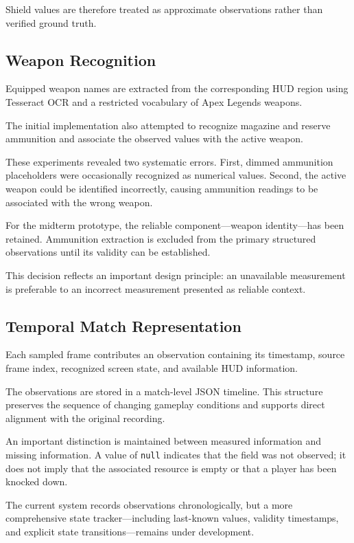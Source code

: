 \documentclass[10pt,letterpaper]{article}
\begin{document}
Shield values are therefore treated as approximate
observations rather than verified ground truth.

\subsection{Weapon Recognition}

Equipped weapon names are extracted from the corresponding
HUD region using Tesseract OCR and a restricted vocabulary
of Apex Legends weapons.

The initial implementation also attempted to recognize
magazine and reserve ammunition and associate the observed
values with the active weapon.

These experiments revealed two systematic errors. First,
dimmed ammunition placeholders were occasionally recognized
as numerical values. Second, the active weapon could be
identified incorrectly, causing ammunition readings to
be associated with the wrong weapon.

For the midterm prototype, the reliable component---weapon
identity---has been retained. Ammunition extraction is
excluded from the primary structured observations until
its validity can be established.

This decision reflects an important design principle:
an unavailable measurement is preferable to an incorrect
measurement presented as reliable context.

\subsection{Temporal Match Representation}

Each sampled frame contributes an observation containing
its timestamp, source frame index, recognized screen state,
and available HUD information.

The observations are stored in a match-level JSON timeline.
This structure preserves the sequence of changing gameplay
conditions and supports direct alignment with the original
recording.

An important distinction is maintained between measured
information and missing information. A value of
\texttt{null} indicates that the field was not observed;
it does not imply that the associated resource is empty
or that a player has been knocked down.

The current system records observations chronologically,
but a more comprehensive state tracker---including
last-known values, validity timestamps, and explicit
state transitions---remains under development.
\end{document}

